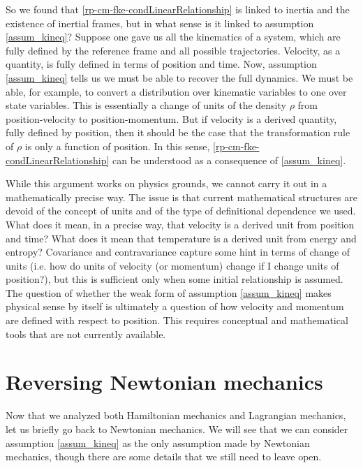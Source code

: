 So we found that \ref{rp-cm-fke-condLinearRelationship} is linked to inertia and the existence of inertial frames, but in what sense is it linked to assumption \ref{assum_kineq}? Suppose one gave us all the kinematics of a system, which are fully defined by the reference frame and all possible trajectories. Velocity, as a quantity, is fully defined in terms of position and time. Now, assumption \ref{assum_kineq} tells us we must be able to recover the full dynamics. We must be able, for example, to convert a distribution over kinematic variables to one over state variables. This is essentially a change of units of the density $\rho$ from position-velocity to position-momentum. But if velocity is a derived quantity, fully defined by position, then it should be the case that the transformation rule of $\rho$ is only a function of position. In this sense, \ref{rp-cm-fke-condLinearRelationship} can be understood as a consequence of \ref{assum_kineq}.

While this argument works on physics grounds, we cannot carry it out in a mathematically precise way. The issue is that current mathematical structures are devoid of the concept of units and of the type of definitional dependence we used. What does it mean, in a precise way, that velocity is a derived unit from position and time? What does it mean that temperature is a derived unit from energy and entropy? Covariance and contravariance capture some hint in terms of change of units (i.e. how do units of velocity (or momentum) change if I change units of position?), but this is sufficient only when some initial relationship is assumed. The question of whether the weak form of assumption \ref{assum_kineq} makes physical sense by itself is ultimately a question of how velocity and momentum are defined with respect to position. This requires conceptual and mathematical tools that are not currently available.


\section{Reversing Newtonian mechanics}

Now that we analyzed both Hamiltonian mechanics and Lagrangian mechanics, let us briefly go back to Newtonian mechanics. We will see that we can consider assumption \ref{assum_kineq} as the only assumption made by Newtonian mechanics, though there are some details that we still need to leave open.

